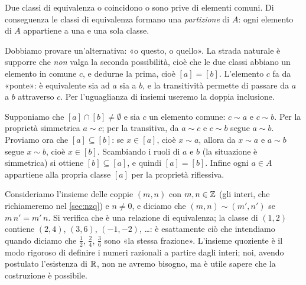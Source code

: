 \begin{proposizione}\label{prop:classi}
Due classi di equivalenza o coincidono o sono prive di elementi comuni. Di conseguenza
le classi di equivalenza formano una \emph{partizione} di $A$: ogni elemento di $A$
appartiene a una e una sola classe.
\end{proposizione}

\begin{schema}
\end{schema}

\begin{strategia}
Dobbiamo provare un'alternativa: «o questo, o quello». La strada naturale è supporre
che \emph{non} valga la seconda possibilità, cioè che le due classi abbiano un elemento
in comune $c$, e dedurne la prima, cioè $[a]=[b]$. L'elemento $c$ fa da «ponte»: è
equivalente sia ad $a$ sia a $b$, e la transitività permette di passare da $a$ a $b$
attraverso $c$. Per l'uguaglianza di insiemi useremo la doppia inclusione.
\end{strategia}

\begin{dimostrazione}
Supponiamo che $[a]\cap[b]\neq\emptyset$ e sia $c$ un elemento comune: $c\sim a$ e
$c\sim b$. Per la proprietà simmetrica $a\sim c$; per la transitiva, da $a\sim c$ e
$c\sim b$ segue $a\sim b$. Proviamo ora che $[a]\subseteq[b]$: se $x\in[a]$, cioè
$x\sim a$, allora da $x\sim a$ e $a\sim b$ segue $x\sim b$, cioè $x\in[b]$. Scambiando
i ruoli di $a$ e $b$ (la situazione è simmetrica) si ottiene $[b]\subseteq[a]$, e
quindi $[a]=[b]$. Infine ogni $a\in A$ appartiene alla propria classe $[a]$ per la
proprietà riflessiva.
\end{dimostrazione}

\begin{esempio}
Consideriamo l'insieme delle coppie $(m,n)$ con $m,n\in\mathbb{Z}$ (gli interi, che
richiameremo nel \cref{sec:nzq}) e $n\neq0$, e diciamo che
$(m,n)\sim(m',n')$ se $m\,n'=m'\,n$. Si verifica che è una relazione di equivalenza; la
classe di $(1,2)$ contiene $(2,4)$, $(3,6)$, $(-1,-2)$, \dots{}: è esattamente ciò che
intendiamo quando diciamo che $\tfrac12$, $\tfrac24$, $\tfrac36$ sono «la stessa
frazione». L'insieme quoziente è il modo rigoroso di definire i numeri razionali a
partire dagli interi; noi, avendo postulato l'esistenza di $\mathbb{R}$, non ne avremo bisogno,
ma è utile sapere che la costruzione è possibile.
\end{esempio}

